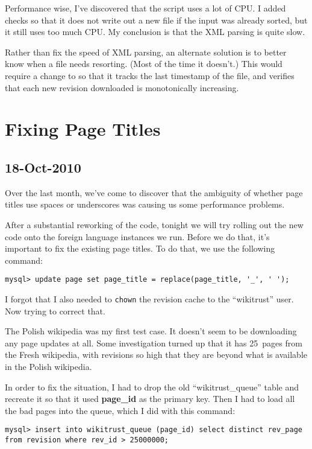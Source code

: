 Performance wise, I've discovered that the 
script uses a lot of CPU.
I added checks so that it does not write out a new file if
the input was already sorted, but it still uses too much CPU.
My conclusion is that the XML parsing is quite slow.

Rather than fix the speed of XML parsing, an alternate solution
is to better know when a file needs resorting.
(Most of the time it doesn't.)
This would require a change to 
so that it tracks the last timestamp of the file,
and verifies that each new revision downloaded is monotonically
increasing.

\section{Fixing Page Titles}

\subsection{18-Oct-2010}

Over the last month, we've come to discover that the ambiguity
of whether page titles use spaces or underscores was causing us
some performance problems.

After a substantial reworking of the code, tonight we will try
rolling out the new code onto the foreign language instances we run.
Before we do that, it's important to fix the existing page titles.
To do that, we use the following command:
\begin{verbatim}
mysql> update page set page_title = replace(page_title, '_', ' ');
\end{verbatim}

I forgot that I also needed to \texttt{chown} the revision cache
to the ``wikitrust'' user.  Now trying to correct that.

The Polish wikipedia was my first test case.
It doesn't seem to be downloading any page updates at all.
Some investigation turned up that it has 25~pages from the
Fresh wikipedia, with revisions so high that they are beyond
what is available in the Polish wikipedia.

In order to fix the situation, I had to drop the old
``wikitrust\_queue'' table and recreate it so that it used
\textbf{page\_id} as the primary key.
Then I had to load all the bad pages into the queue, which
I did with this command:
\begin{verbatim}
mysql> insert into wikitrust_queue (page_id) select distinct rev_page from revision where rev_id > 25000000;
\end{verbatim}

